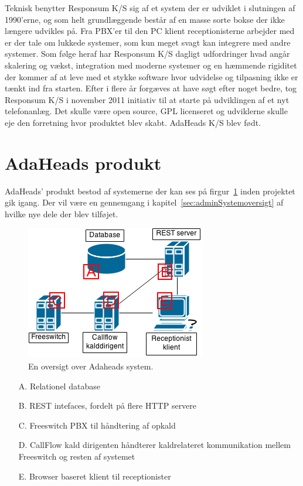 Teknisk benytter Responsum K/S sig af et system der er udviklet i slutningen af 1990’erne, og som helt grundlæggende består af en masse sorte bokse der ikke længere udvikles på. Fra PBX’er til den PC klient receptionisterne arbejder med er der tale om lukkede systemer, som kun meget svagt kan integrere med andre systemer. Som følge heraf har Responsum K/S dagligt udfordringer hvad angår skalering og vækst, integration med moderne systemer og en hæmmende rigiditet der kommer af at leve med et stykke software hvor udvidelse og tilpasning ikke er tænkt ind fra starten.
Efter i flere år forgæves at have søgt efter noget bedre, tog Responsum K/S i november 2011 initiativ til at starte på udviklingen af et nyt telefonanlæg. Det skulle være open source, GPL licenseret og udviklerne skulle eje den forretning hvor produktet blev skabt. AdaHeads K/S blev født.

\pagebreak

\section{AdaHeads produkt}
AdaHeads' produkt bestod af systemerne der kan ses på firgur~\ref{fig:adaheadssystembefore} inden projektet gik igang. Der vil være en gennemgang i kapitel~\ref{sec:adminSystemoversigt} af hvilke nye dele der blev tilføjet.
\begin{figure}[ht!]
\centering
\includegraphics[scale=0.5]{images/system_before_admin.png}
\caption{En oversigt over Adaheads system.}
\label{fig:adaheadssystembefore}
\end{figure}
\begin{enumerate}
	\item[A.]{Relationel database}
	\item[B.]{REST intefaces, fordelt på flere HTTP servere}
	\item[C.]{Freeswitch PBX til håndtering af opkald} 
	\item[D.]{CallFlow kald dirigenten håndterer kaldrelateret kommunikation mellem Freeswitch og resten af systemet}
	\item[E.]{Browser baseret klient til receptionister}
\end{enumerate}
